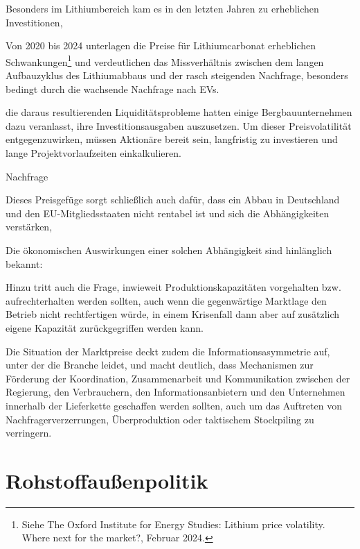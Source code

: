 \documentclass[12pt,a4paper,oneside]{book} %
\begin{document}
{Besonders im Lithiumbereich kam es in den letzten Jahren zu erheblichen Investitionen, 

Von 2020 bis 2024 unterlagen die Preise für Lithiumcarbonat erheblichen Schwankungen\footnote{Siehe The Oxford Institute for Energy Studies: Lithium price volatility. Where next for the market?, Februar 2024.} und verdeutlichen das Missverhältnis zwischen dem langen Aufbauzyklus des Lithiumabbaus und der rasch steigenden Nachfrage, besonders bedingt durch die wachsende Nachfrage nach EVs.\autocite{Spot price fluctuations of battery-grade lithium carbonate and supply chain disruptions: The survival game of new energy enterprises}

die daraus resultierenden Liquiditätsprobleme hatten einige Bergbauunternehmen dazu veranlasst, ihre Investitionsausgaben auszusetzen. Um dieser Preisvolatilität entgegenzuwirken, müssen Aktionäre bereit sein, langfristig zu investieren und lange Projektvorlaufzeiten einkalkulieren.\autocite{EY, Why mineral supply may be an e-mobility roadblock}

Nachfrage

Dieses Preisgefüge sorgt schließlich auch dafür, dass ein Abbau in Deutschland und den EU-Mitgliedsstaaten nicht rentabel ist und sich die Abhängigkeiten verstärken,

Die ökonomischen Auswirkungen einer solchen Abhängigkeit sind hinlänglich bekannt: 


Hinzu tritt auch die Frage, inwieweit Produktionskapazitäten vorgehalten bzw. aufrechterhalten werden sollten, auch wenn die gegenwärtige Marktlage den Betrieb nicht rechtfertigen würde, in einem Krisenfall dann aber auf zusätzlich eigene Kapazität zurückgegriffen werden kann.

Die Situation der Marktpreise deckt zudem die Informationsasymmetrie auf, unter der die Branche leidet, und macht deutlich, dass Mechanismen zur Förderung der Koordination, Zusammenarbeit und Kommunikation zwischen der Regierung, den Verbrauchern, den Informationsanbietern und den Unternehmen innerhalb der Lieferkette geschaffen werden sollten, auch um das Auftreten von Nachfragerverzerrungen, Überproduktion oder taktischem Stockpiling zu verringern.\autocite{Surging lithium price will not impede the electric vehicle boom, Xin Sun}



\section{Rohstoffaußenpolitik}

}
\end{document}
